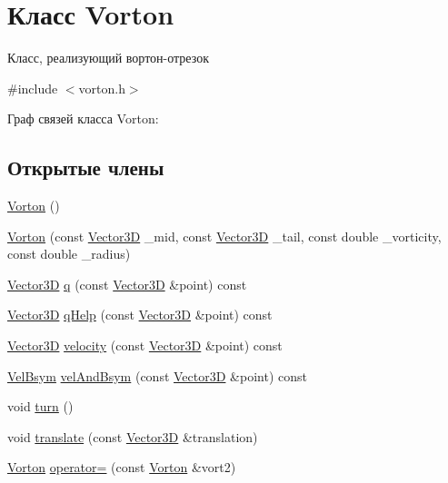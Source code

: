 \hypertarget{class_vorton}{}\section{Класс Vorton}
\label{class_vorton}


Класс, реализующий вортон-\/отрезок  




{\ttfamily \#include $<$vorton.\+h$>$}



Граф связей класса Vorton\+:
\subsection*{Открытые члены}
\begin{DoxyCompactItemize}
\item 
\mbox{\hyperlink{class_vorton_a0290e8bc879545e9bc7f796b53cfad64}{Vorton}} ()
\item 
\mbox{\hyperlink{class_vorton_a6e0ac562d3b52e9ecc0823308ea791e2}{Vorton}} (const \mbox{\hyperlink{class_vector3_d}{Vector3D}} \+\_\+mid, const \mbox{\hyperlink{class_vector3_d}{Vector3D}} \+\_\+tail, const double \+\_\+vorticity, const double \+\_\+radius)
\item 
\mbox{\hyperlink{class_vector3_d}{Vector3D}} \mbox{\hyperlink{class_vorton_a8b514a5ead7e36def408477d3cd43a52}{q}} (const \mbox{\hyperlink{class_vector3_d}{Vector3D}} \&point) const
\item 
\mbox{\hyperlink{class_vector3_d}{Vector3D}} \mbox{\hyperlink{class_vorton_a384fd259981645366a748be89e3b51e6}{q\+Help}} (const \mbox{\hyperlink{class_vector3_d}{Vector3D}} \&point) const
\item 
\mbox{\hyperlink{class_vector3_d}{Vector3D}} \mbox{\hyperlink{class_vorton_a8c693ef015b7acc843ec32c80e042a4f}{velocity}} (const \mbox{\hyperlink{class_vector3_d}{Vector3D}} \&point) const
\item 
\mbox{\hyperlink{struct_vel_bsym}{Vel\+Bsym}} \mbox{\hyperlink{class_vorton_a3e4d19e72822aa20be8482046c3e5598}{vel\+And\+Bsym}} (const \mbox{\hyperlink{class_vector3_d}{Vector3D}} \&point) const
\item 
void \mbox{\hyperlink{class_vorton_a2a9a3608f4296cadc7962661e854a765}{turn}} ()
\item 
void \mbox{\hyperlink{class_vorton_a0b826326d0c9c93298b95babb17b43a1}{translate}} (const \mbox{\hyperlink{class_vector3_d}{Vector3D}} \&translation)
\item 
\mbox{\hyperlink{class_vorton}{Vorton}} \mbox{\hyperlink{class_vorton_af7881379dabb2ab1585c557f1d0da136}{operator=}} (const \mbox{\hyperlink{class_vorton}{Vorton}} \&vort2)

\end{DoxyCompactItemize}
